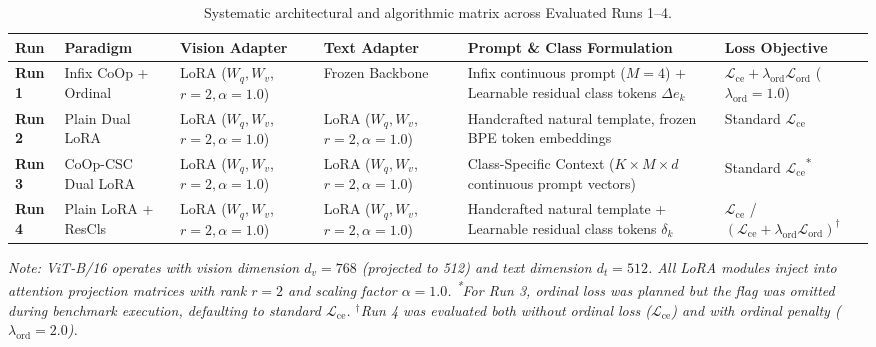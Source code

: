\documentclass[letterpaper,11pt,leqno]{article}
\begin{document}
\begin{table}[H]
\centering
\small
\caption{Systematic architectural and algorithmic matrix across Evaluated Runs 1--4.}
\label{tab:paradigm_matrix}
\begin{tabularx}{\textwidth}{l >{\raggedright\arraybackslash}p{2.3cm} >{\raggedright\arraybackslash}p{2.2cm} >{\raggedright\arraybackslash}p{2.2cm} >{\raggedright\arraybackslash}X >{\raggedright\arraybackslash}p{2.6cm}}
\toprule
\textbf{Run} & \textbf{Paradigm} & \textbf{Vision Adapter} & \textbf{Text Adapter} & \textbf{Prompt \& Class Formulation} & \textbf{Loss Objective} \\
\midrule
\rowcolor{run1blue}
\textbf{Run 1} & Infix CoOp + Ordinal & LoRA ($W_q, W_v$, $r{=}2, \alpha{=}1.0$) & Frozen Backbone & Infix continuous prompt ($M{=}4$) + Learnable residual class tokens $\Delta e_k$ & $\mathcal{L}_{\mathrm{ce}} + \lambda_{\mathrm{ord}}\mathcal{L}_{\mathrm{ord}}$ ($\lambda_{\mathrm{ord}}{=}1.0$) \\
\addlinespace
\rowcolor{run2orange}
\textbf{Run 2} & Plain Dual LoRA & LoRA ($W_q, W_v$, $r{=}2, \alpha{=}1.0$) & LoRA ($W_q, W_v$, $r{=}2, \alpha{=}1.0$) & Handcrafted natural template, frozen BPE token embeddings & Standard $\mathcal{L}_{\mathrm{ce}}$ \\
\addlinespace
\rowcolor{run3green}
\textbf{Run 3} & CoOp-CSC Dual LoRA & LoRA ($W_q, W_v$, $r{=}2, \alpha{=}1.0$) & LoRA ($W_q, W_v$, $r{=}2, \alpha{=}1.0$) & Class-Specific Context ($K \times M \times d$ continuous prompt vectors) & Standard $\mathcal{L}_{\mathrm{ce}}$\textsuperscript{*} \\
\addlinespace
\rowcolor{run4red}
\textbf{Run 4} & Plain LoRA + ResCls & LoRA ($W_q, W_v$, $r{=}2, \alpha{=}1.0$) & LoRA ($W_q, W_v$, $r{=}2, \alpha{=}1.0$) & Handcrafted natural template + Learnable residual class tokens $\delta_k$ & $\mathcal{L}_{\mathrm{ce}}$ / $(\mathcal{L}_{\mathrm{ce}} + \lambda_{\mathrm{ord}}\mathcal{L}_{\mathrm{ord}})^{\dagger}$ \\
\bottomrule
\end{tabularx}
\vspace{0.3em}
\raggedright\small \textit{Note: ViT-B/16 operates with vision dimension $d_v = 768$ (projected to 512) and text dimension $d_t = 512$. All LoRA modules inject into attention projection matrices with rank $r=2$ and scaling factor $\alpha=1.0$. \textsuperscript{*}For Run 3, ordinal loss was planned but the flag was omitted during benchmark execution, defaulting to standard $\mathcal{L}_{\mathrm{ce}}$. $^{\dagger}$Run 4 was evaluated both without ordinal loss ($\mathcal{L}_{\mathrm{ce}}$) and with ordinal penalty ($\lambda_{\mathrm{ord}}{=}2.0$).}
\end{table}
\end{document}
